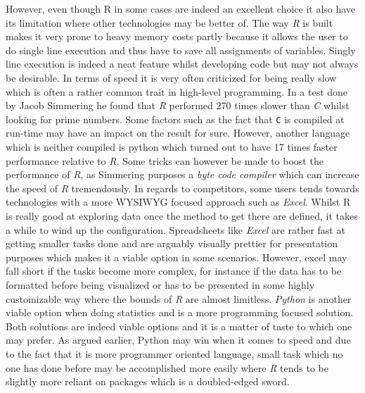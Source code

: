 \documentclass[Report.tex]{subfiles}
\begin{document}
 However, even though R in some cases are indeed an excellent choice it also have its limitation where other technologies may be better of. The way \textit{R} is built makes it very prone to heavy memory costs partly because it allows the user to do single line execution and thus have to save all assignments of variables. Singly line execution is indeed a neat feature whilst developing code but may not always be desirable.  In terms of speed it is very often criticized for being really slow which is often a rather common trait in high-level programming. In a test done by Jacob Simmering \cite{R} he found that \textit{R} performed 270 times slower than \textit{C} whilst looking for prime numbers. Some factors such as the fact that \texttt{C} is compiled at run-time may have an impact on the result for sure. However, another language which is neither compiled is python which turned out to have 17 times faster performance relative to \textit{R}. Some tricks can however be made to boost the performance of \textit{R}, as Simmering purposes a \textit{byte code compiler} which can increase the speed of \textit{R} tremendously. In regards to competitors, some users tends towards technologies with a more WYSIWYG focused approach such as \textit{Excel}. Whilst R is really good at exploring data once the method to get there are defined, it takes a while to wind up the configuration. Spreadsheets like \textit{Excel} are rather fast at getting smaller tasks done and are arguably visually prettier for presentation purposes which makes it a viable option in some scenarios. However, excel may fall short if the tasks become more complex, for instance if the data has to be formatted before being visualized or has to be presented in some highly customizable way where the bounds of \textit{R} are almost limitless. \textit{Python} is another viable option when doing statistics and is a more programming focused solution. Both solutions are indeed viable options and it is a matter of taste to which one may prefer. As argued earlier, Python may win when it comes to speed and due to the fact that it is more programmer oriented language, small task which no one has done before may be accomplished more easily where \textit{R} tends to be slightly more reliant on packages which is a doubled-edged sword.
\end{document}
